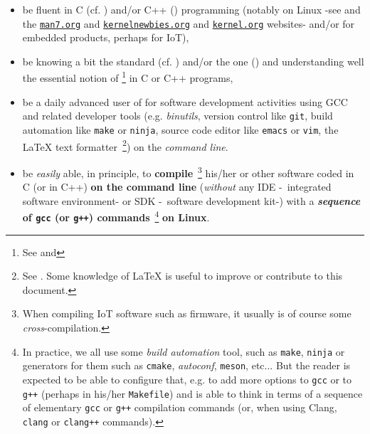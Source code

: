 \begin{itemize}

  \item be fluent in C (cf. \cite{Kernighan:1988:CPL,
    gusted:t2019:modern}) and/or C++ (\cite{Stroustrup:2014:CplusPlus,
    Stroustrup:2020:thriving}) programming (notably on Linux -see
    \cite{Mitchell:2001:ALP, Kerrisk:2010:LinuxProgramming} and the
    \href{https://man7.org/}{\texttt{man7.org}} and
    \href{https://kernelnewbies.org/}{\texttt{kernelnewbies.org}} and
    \href{https://www.kernel.org/}{\texttt{kernel.org}} websites-
    and/or for embedded products, perhaps for IoT),

  \item be knowing a bit the  standard
    (cf. \cite{C11:std,Memarian:2016:PLDI}) and/or the
     one (\cite{CplusPlus11:std}) and
    understanding well the essential notion of  \footnote{See
      and } in C or C++
    programs,

  \item be a daily advanced user of  for software
    development activities 
     using GCC and related developer tools
    (e.g. \textit{binutils}, version control like \texttt{git}, build
    automation like \texttt{make} or \texttt{ninja}, source code
    editor like \texttt{emacs} or \texttt{vim}, the {\LaTeX} text
    formatter~\footnote{See
      . Some knowledge of
            {\LaTeX} is useful to improve or contribute to this
            document.}) on the \emph{command line}.
    
    \item be \emph{easily} able, in principle, to
      \textbf{compile}~\footnote{When compiling IoT software such as
        firmware, it usually is of course some
        \emph{cross}-compilation.}  his/her or other software coded in
      C (or in C++) \textbf{on the command line} (\emph{without} any
      IDE
      -~integrated software
      environment- or  SDK
      -~software development kit-)
      with a \textbf{\emph{sequence} of \texttt{gcc} (or \texttt{g++})
        commands}~\footnote{In practice, we all use some \emph{build
          automation} tool, such as \texttt{make}, \texttt{ninja} or
        generators for them such as \texttt{cmake}, \emph{autoconf},
        \texttt{meson}, etc... But the reader is expected to be able
        to configure that, e.g. to add more options to \texttt{gcc} or
        to \texttt{g++} (perhaps in his/her \texttt{Makefile}) and is
        able to think in terms of a sequence of elementary
        \texttt{gcc} or \texttt{g++} compilation commands (or, when
        using Clang, \texttt{clang} or \texttt{clang++} commands).}
      \textbf{on Linux}.




\end{itemize}
